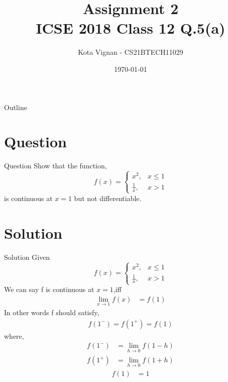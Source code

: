 \documentclass{beamer}
\title{Assignment 2 \\ ICSE 2018 Class 12 Q.5(a)}
\author{Kota Vignan - CS21BTECH11029}
\date{\today}
\providecommand{\brak}[1]{\ensuremath{\left(#1\right)}}
\begin{document}
\begin{frame}
    \titlepage 
\end{frame}

\logo{}


\begin{frame}{Outline}
    \tableofcontents
\end{frame}


\section{Question}
\begin{frame}{Question}
Show that the function,
\begin{equation*}
        f(x) = \begin{cases}
                       x^2, & x\le 1 \\ 
                       \frac{1}{x}, & x > 1
               \end{cases}
\end{equation*}                     
is continuous at $ x = 1 $ but not differentiable.
\end{frame}

 
\section{Solution}
\begin{frame}{Solution}
Given  
            \begin{equation*} 
                 f\brak{x}  = \begin{cases}
                              x^2,  & x \leq 1 \\
                              \frac{1}{x} , & x  >  1
                           \end{cases}
            \end{equation*}  
   We can say f is continuous at $x = 1$,iff 
            \begin{align}
                 \lim_{x \to 1}f\brak{x} &= f\brak{1}
            \end{align}
    In other words f should satisfy,
            \begin{align}
                 f\brak{1^-} =f\brak{1^+} =f\brak{1} 
            \end{align}
    where,
            \begin{align}
                 f\brak{1^-} &=  \lim_{h\to0}f\brak{1-h}\\
                 f\brak{1^+} &=  \lim_{h\to0}f\brak{1+h}
            \end{align}
            \begin{align}
                 f\brak{1} &= 1\label{eq 5}
            \end{align}
\end{frame}
\end{document}
